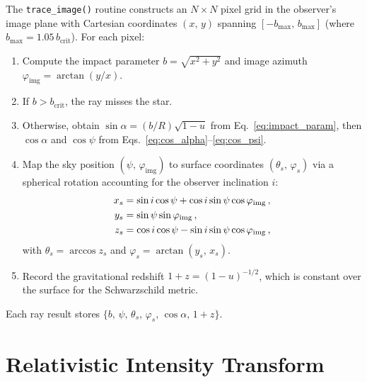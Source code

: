 The \texttt{trace\_image()} routine constructs an $N \times N$ pixel grid in
the observer's image plane with Cartesian coordinates $(x,\,y)$ spanning
$[-b_{\max},\,b_{\max}]$ (where $b_{\max} = 1.05\,b_{\mathrm{crit}}$).
For each pixel:
\begin{enumerate}
  \item Compute the impact parameter $b = \sqrt{x^{2} + y^{2}}$ and image
    azimuth $\varphi_{\mathrm{img}} = \arctan(y/x)$.
  \item If $b > b_{\mathrm{crit}}$, the ray misses the star.
  \item Otherwise, obtain $\sin\alpha = (b/R)\sqrt{1 - u}$ from
    Eq.~\eqref{eq:impact_param}, then $\cos\alpha$ and $\cos\psi$ from
    Eqs.~\eqref{eq:cos_alpha}--\eqref{eq:cos_psi}.
  \item Map the sky position $(\psi,\,\varphi_{\mathrm{img}})$ to surface
    coordinates $(\theta_s,\,\varphi_s)$ via a spherical rotation accounting
    for the observer inclination $i$:
    \begin{align}
      x_s &= \sin i\cos\psi + \cos i\sin\psi\cos\varphi_{\mathrm{img}}\,,
        \notag \\
      y_s &= \sin\psi\sin\varphi_{\mathrm{img}}\,,
        \label{eq:sky_to_surface} \\
      z_s &= \cos i\cos\psi - \sin i\sin\psi\cos\varphi_{\mathrm{img}}\,,
        \notag
    \end{align}
    with $\theta_s = \arccos z_s$ and $\varphi_s = \arctan(y_s,\,x_s)$.
  \item Record the gravitational redshift $1 + z = (1 - u)^{-1/2}$,
    which is constant over the surface for the Schwarzschild metric.
\end{enumerate}
Each ray result stores
$\{b,\,\psi,\,\theta_s,\,\varphi_s,\,\cos\alpha,\,1{+}z\}$.


\section{Relativistic Intensity Transform}
\label{sec:intensity_transform}

